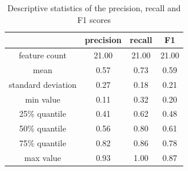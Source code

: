 \begin{table}[!ht]
    \centering
    \begin{tabular}{|c|c|c|c|}
        \hline
        \textbf{} & \textbf{precision} & \textbf{recall} & \textbf{F1} \\ \hline
        feature count & 21.00 & 21.00 & 21.00 \\ \hline
        mean & 0.57 & 0.73 & 0.59 \\ \hline
        standard deviation & 0.27 & 0.18 & 0.21 \\ \hline
        min value & 0.11 & 0.32 & 0.20 \\ \hline
        25\% quantile & 0.41 & 0.62 & 0.48 \\ \hline
        50\% quantile & 0.56 & 0.80 & 0.61 \\ \hline
        75\% quantile & 0.82 & 0.86 & 0.78 \\ \hline
        max value & 0.93 & 1.00 & 0.87 \\ \hline
    \end{tabular}
    \caption{Descriptive statistics of the precision, recall and F1 scores}
    \label{tab:mood-accuracy}
\end{table}

